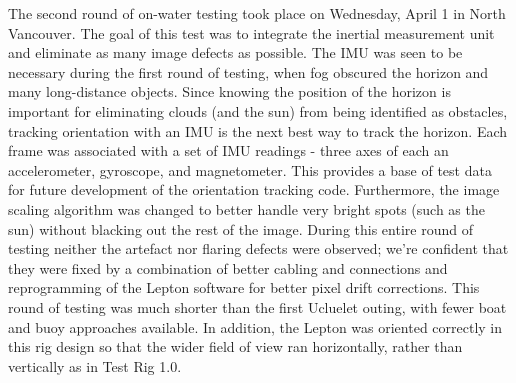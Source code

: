 The second round of on-water testing took place on Wednesday, April 1 in North Vancouver. The goal of this test was to integrate the inertial measurement unit and eliminate as many image defects as possible. The IMU was seen to be necessary during the first round of testing, when fog obscured the horizon and many long-distance objects. Since knowing the position of the horizon is important for eliminating clouds (and the sun) from being identified as obstacles, tracking orientation with an IMU is the next best way to track the horizon. Each frame was associated with a set of IMU readings - three axes of each an accelerometer, gyroscope, and magnetometer. This provides a base of test data for future development of the orientation tracking code. Furthermore, the image scaling algorithm was changed to better handle very bright spots (such as the sun) without blacking out the rest of the image.  During this entire round of testing neither the artefact nor flaring defects were observed; we're confident that they were fixed by a combination of better cabling and connections and reprogramming of the Lepton software for better pixel drift corrections. This round of testing was much shorter than the first Ucluelet outing, with fewer boat and buoy approaches available. In addition, the Lepton was oriented correctly in this rig design so that the wider field of view ran horizontally, rather than vertically as in Test Rig 1.0.

